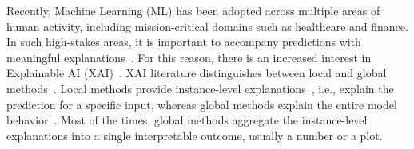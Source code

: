 \documentclass{ecai}  %
\begin{document}
Recently, Machine Learning (ML) has been adopted across multiple areas
of human activity, including mission-critical domains such as
healthcare and finance. In such high-stakes areas, it is important to
accompany predictions with meaningful explanations~\cite{wiens2019no,
  freiesleben2022scientific}.  For this reason, there is an increased
interest in Explainable AI (XAI)~\cite{ribeiro2016should,
  koh2017understanding}. XAI literature distinguishes between local
and global methods~\cite{molnar2020interpretable}. Local methods
provide instance-level explanations~\cite{casalicchio2019visualizing},
i.e., explain the prediction for a specific input, whereas global
methods explain the entire model behavior~\cite{kim2016examples}. Most
of the times, global methods aggregate the instance-level explanations
into a single interpretable outcome, usually a number or a plot.
\end{document}
